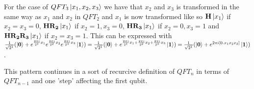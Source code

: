 \vspace{\baselineskip}
\noindent
For the case of $QFT_3\ket{x_1,x_2,x_3}$ we have that $x_2$ and $x_3$ is transformed in the same way as $x_1$ and $x_2$ in $QFT_2$ and $x_1$ is now transformed like so $\mathbf{H}\ket{x_1}$ if $x_2=x_3=0$, $\mathbf{H}\mathbf{R_{2}}\ket{x_1}$ if $x_2=1,x_3=0$, $\mathbf{H}\mathbf{R_{3}}\ket{x_1}$ if $x_2=0,x_3=1$ and $\mathbf{H}\mathbf{R_{2}}\mathbf{R_{3}}\ket{x_1}$ if $x_2=x_3=1$. 
This can be expressed with 
$\frac{1}{\sqrt{2^1}}(\ket{\mathbf{0}}+e^{\frac{2\pi i}{2^1}x_1}e^{\frac{2\pi i}{2^2}x_2}e^{\frac{2\pi i}{2^3}x_3}\ket{\mathbf{1}})= \frac{1}{\sqrt{2^1}}(\ket{\mathbf{0}}+e^{\frac{2\pi i}{2^1}x_1+\frac{2\pi i}{2^2}x_2+\frac{2\pi i}{2^3}x_3}\ket{\mathbf{1}})=\frac{1}{\sqrt{2^1}}(\ket{\mathbf{0}}+e^{2\pi i[0.x_1x_2x_3]}\ket{\mathbf{1}})$.

This pattern continues in a sort of recurcive definition of $QFT_n$ in terms of $QFT_{n-1}$ and one 'step' affecting the first qubit. 



